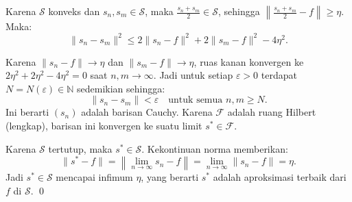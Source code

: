 \documentclass[aspectratio=169,11pt]{beamer}
\theoremstyle{definition}
\newcommand{\N}{\mathbb{N}}
\begin{document}
\begin{frame}[allowframebreaks]{\insertsection}{\insertsubsection}
  Karena $\mathcal{S}$ konveks dan $s_n, s_m \in \mathcal{S}$, maka $\frac{s_n+s_m}{2} \in \mathcal{S}$, sehingga $\left\|\frac{s_n+s_m}{2} - f\right\| \geq \eta$. Maka:
  \begin{equation*}
    \|s_n - s_m\|^2 \leq 2\|s_n - f\|^2 + 2\|s_m - f\|^2 - 4\eta^2.
  \end{equation*}

  Karena $\|s_n - f\| \to \eta$ dan $\|s_m - f\| \to \eta$, ruas kanan konvergen ke $2\eta^2 + 2\eta^2 - 4\eta^2 = 0$ saat $n, m \to \infty$. Jadi untuk setiap $\varepsilon > 0$ terdapat $N = N(\varepsilon) \in \N$ sedemikian sehingga:
  \begin{equation*}
    \|s_n - s_m\| < \varepsilon \quad \text{untuk semua } n, m \geq N.
  \end{equation*}
  Ini berarti $(s_n)$ adalah barisan Cauchy. Karena $\mathcal{F}$ adalah ruang Hilbert (lengkap), barisan ini konvergen ke suatu limit $s^* \in \mathcal{F}$.

  Karena $\mathcal{S}$ tertutup, maka $s^* \in \mathcal{S}$. Kekontinuan norma memberikan:
  \begin{equation*}
    \|s^* - f\| = \left\|\lim_{n \to \infty} s_n - f\right\| = \lim_{n \to \infty} \|s_n - f\| = \eta.
  \end{equation*}
  Jadi $s^* \in \mathcal{S}$ mencapai infimum $\eta$, yang berarti $s^*$ adalah aproksimasi terbaik dari $f$ di $\mathcal{S}$. \qed

\end{frame}
\end{document}
